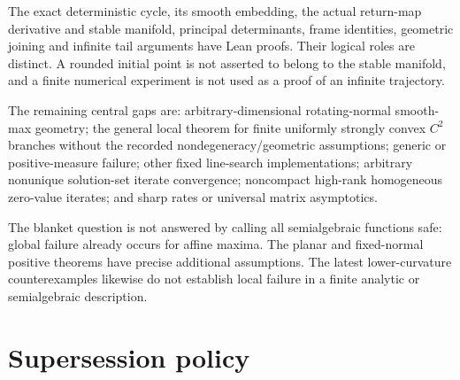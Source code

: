 The exact deterministic cycle, its smooth embedding, the actual return-map derivative and stable manifold, principal determinants, frame identities, geometric joining and infinite tail arguments have Lean proofs. Their logical roles are distinct. A rounded initial point is not asserted to belong to the stable manifold, and a finite numerical experiment is not used as a proof of an infinite trajectory.

The remaining central gaps are: arbitrary-dimensional rotating-normal smooth-max geometry; the general local theorem for finite uniformly strongly convex \(C^2\) branches without the recorded nondegeneracy/geometric assumptions; generic or positive-measure failure; other fixed line-search implementations; arbitrary nonunique solution-set iterate convergence; noncompact high-rank homogeneous zero-value iterates; and sharp rates or universal matrix asymptotics.

The blanket question is not answered by calling all semialgebraic functions safe: global failure already occurs for affine maxima. The planar and fixed-normal positive theorems have precise additional assumptions. The latest lower-curvature counterexamples likewise do not establish local failure in a finite analytic or semialgebraic description.



\clearpage
\section{Supersession policy}\label{supersession-policy}

